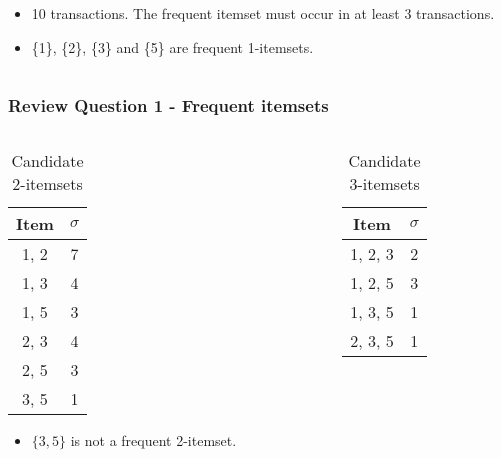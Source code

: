 \documentclass[aspectratio=169, 10pt]{beamer}
\begin{document}
\begin{frame}[t]
\begin{columns}
\begin{column}{0.5\textwidth}
        \begin{itemize}
            \item 10 transactions. The frequent itemset must occur in at least 3 transactions.
            \item \{1\}, \{2\}, \{3\} and \{5\} are frequent 1-itemsets.
        \end{itemize}
    \end{column}
\end{columns}

\end{frame}

\begin{frame}[t]
\frametitle{Review Question 1 - Frequent itemsets}
\small

\begin{columns}
    \begin{column}{0.5\textwidth} 
        \begin{table}[]
            \caption{Candidate 2-itemsets}
            \begin{tabular}{c|c}
            Item                       &  $\sigma$                \\ \hline
            1, 2                       & 7                        \\
            1, 3                       & 4                        \\
            1, 5                       & 3                        \\
            2, 3                       & 4                        \\
            2, 5                       & 3                        \\
            {\color[HTML]{FE0000} 3, 5} & {\color[HTML]{FE0000} 1}
            \end{tabular}
        \end{table}

        \begin{itemize}
            \item $\{3, 5\}$ is not a frequent 2-itemset.
        \end{itemize}
    \end{column}
    \begin{column}{0.5\textwidth} %
        \begin{table}[]
            \caption{Candidate 3-itemsets}
            \begin{tabular}{c|c}
            Item                           & $\sigma$            \\ \hline
            {\color[HTML]{FE0000} 1, 2, 3} & {\color[HTML]{FE0000} 2} \\
            1, 2, 5                        & 3                        \\
            {\color[HTML]{FE0000} 1, 3, 5} & {\color[HTML]{FE0000} 1} \\
            {\color[HTML]{FE0000} 2, 3, 5} & {\color[HTML]{FE0000} 1}
            \end{tabular}
        \end{table}


\end{column}
\end{columns}
\end{frame}
\end{document}
